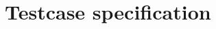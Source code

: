 \documentclass[a4paper,10pt]{scrreprt}
\title{}
\author{Nick Mayerhofer}
\author{Lukas Petermann}
\begin{document}
\maketitle
\tableofcontents






\section{Testcase specification}





\end{document}
